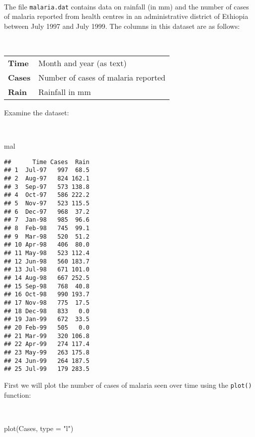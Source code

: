 \documentclass[
  12pt,
  a4paper]{book}
\newenvironment{Shaded}{\begin{snugshade}}{\end{snugshade}}
\newcommand{\AttributeTok}[1]{\textcolor[rgb]{0.77,0.63,0.00}{#1}}
\newcommand{\FunctionTok}[1]{\textcolor[rgb]{0.00,0.00,0.00}{#1}}
\newcommand{\NormalTok}[1]{#1}
\newcommand{\StringTok}[1]{\textcolor[rgb]{0.31,0.60,0.02}{#1}}
\begin{document}
~

The file \texttt{malaria.dat} contains data on rainfall (in mm) and the number of cases of malaria reported from health centres in an administrative district of Ethiopia between July 1997 and July 1999. The columns in this dataset are as follows:

~

\begin{longtable}[]{@{}
  >{\raggedright\arraybackslash}p{}
  >{\raggedright\arraybackslash}p{}@{}}
\toprule
\endhead
\textbf{Time} & Month and year (as text) \\
\textbf{Cases} & Number of cases of malaria reported \\
\textbf{Rain} & Rainfall in mm \\
\bottomrule
\end{longtable}

\newpage

Examine the dataset:

~

\begin{Shaded}
\begin{Highlighting}[]
\NormalTok{mal}
\end{Highlighting}
\end{Shaded}

\begin{verbatim}
##      Time Cases  Rain
## 1  Jul-97   997  68.5
## 2  Aug-97   824 162.1
## 3  Sep-97   573 138.8
## 4  Oct-97   586 222.2
## 5  Nov-97   523 115.5
## 6  Dec-97   968  37.2
## 7  Jan-98   985  96.6
## 8  Feb-98   745  99.1
## 9  Mar-98   520  51.2
## 10 Apr-98   406  80.0
## 11 May-98   523 112.4
## 12 Jun-98   560 183.7
## 13 Jul-98   671 101.0
## 14 Aug-98   667 252.5
## 15 Sep-98   768  40.8
## 16 Oct-98   990 193.7
## 17 Nov-98   775  17.5
## 18 Dec-98   833   0.0
## 19 Jan-99   672  33.5
## 20 Feb-99   505   0.0
## 21 Mar-99   320 106.8
## 22 Apr-99   274 117.4
## 23 May-99   263 175.8
## 24 Jun-99   264 187.5
## 25 Jul-99   179 283.5
\end{verbatim}

\newpage

First we will plot the number of cases of malaria seen over time using the \texttt{plot()} function:

~

\begin{Shaded}
\begin{Highlighting}[]
\FunctionTok{plot}\NormalTok{(Cases, }\AttributeTok{type =} \StringTok{"l"}\NormalTok{)}
\end{Highlighting}
\end{Shaded}
\end{document}

